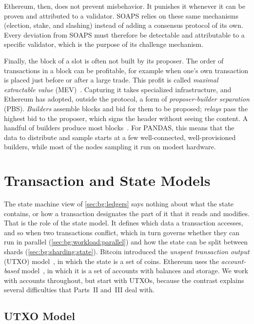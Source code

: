 Ethereum, then, does not prevent misbehavior.
It punishes it whenever it can be proven and attributed to a validator.
SOAPS relies on these same mechanisms (election, stake, and slashing) instead of adding a consensus protocol of its own.
Every deviation from SOAPS must therefore be detectable and attributable to a specific validator, which is the purpose of its challenge mechanism.

Finally, the block of a slot is often not built by its proposer.
The order of transactions in a block can be profitable, for example when one's own transaction is placed just before or after a large trade.
This profit is called \emph{maximal extractable value} (MEV)~\cite{daian2020flashboys}.
Capturing it takes specialized infrastructure, and Ethereum has adopted, outside the protocol, a form of \emph{proposer-builder separation} (PBS).
\emph{Builders} assemble blocks and bid for them to be proposed; \emph{relays} pass the highest bid to the proposer, which signs the header without seeing the content.
A handful of builders produce most blocks~\cite{heimbach2023pbs}.
For PANDAS, this means that the data to distribute and sample starts at a few well-connected, well-provisioned builders, while most of the nodes sampling it run on modest hardware.

\section{Transaction and State Models}\label{sec:bg:state-model}

The state machine view of \autoref{sec:bg:ledgers} says nothing about what the state contains, or how a transaction designates the part of it that it reads and modifies.
That is the role of the state model.
It defines which data a transaction accesses, and so when two transactions conflict, which in turn governs whether they can run in parallel (\autoref{sec:bg:workload:parallel}) and how the state can be split between shards (\autoref{sec:bg:sharding:state}).
Bitcoin introduced the \emph{unspent transaction output} (UTXO) model~\cite{nakamoto2008bitcoin}, in which the state is a set of coins.
Ethereum uses the \emph{account-based} model~\cite{wood2014ethereum}, in which it is a set of accounts with balances and storage.
We work with accounts throughout, but start with UTXOs, because the contrast explains several difficulties that Parts~II and~III deal with.

\subsection{UTXO Model}\label{sec:bg:state-model:utxo}

